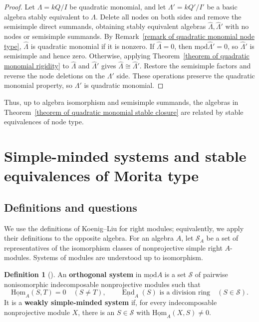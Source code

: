\documentclass[11pt]{article}
\newcommand{\End}{\operatorname{End}}
\newcommand{\smod}{\operatorname{\underline{mod}}}
\newcommand{\sHom}{\operatorname{\underline{Hom}}}
\providecommand{\varLambda}{\Lambda}
\theoremstyle{definition}
\newtheorem{definition}[theorem]{Definition}
\begin{document}
		\begin{proof}
			Let $\varLambda=kQ/I$ be quadratic monomial, and let $\varLambda'=kQ'/I'$ be a basic algebra stably equivalent to $\varLambda$.
			Delete all nodes on both sides and remove the semisimple direct summands, obtaining stably equivalent algebras $\widehat{\varLambda},\widehat{\varLambda}'$ with no nodes or semisimple summands.
			By Remark~\ref{remark of quadratic monomial node type}, $\widehat{\varLambda}$ is quadratic monomial if it is nonzero.
			If $\widehat{\varLambda}=0$, then $\smod\widehat{\varLambda}'=0$, so $\widehat{\varLambda}'$ is semisimple and hence zero.
			Otherwise, applying Theorem~\ref{theorem of quadratic monomial rigidity} to $\widehat{\varLambda}$ and $\widehat{\varLambda}'$ gives $\widehat{\varLambda}\cong\widehat{\varLambda}'$.
			Restore the semisimple factors and reverse the node deletions on the $\varLambda'$ side.
			These operations preserve the quadratic monomial property, so $\varLambda'$ is quadratic monomial.
		\end{proof}

		Thus, up to algebra isomorphism and semisimple summands, the algebras in Theorem~\ref{theorem of quadratic monomial stable closure} are related by stable equivalences of node type.

\section{Simple-minded systems and stable equivalences of Morita type}\label{section of sms and Morita type}


	\subsection{Definitions and questions}

		We use the definitions of Koenig--Liu for right modules; equivalently, we apply their definitions to the opposite algebra.
		For an algebra $A$, let $\mathcal S_A$ be a set of representatives of the isomorphism classes of nonprojective simple right $A$-modules.
		Systems of modules are understood up to isomorphism.

		\begin{definition}[{\cite[Definitions~2.1 and~5.3]{KL12}}]\label{definition of weak sms}
			An \textbf{orthogonal system} in $\smod A$ is a set $\mathcal S$ of pairwise nonisomorphic indecomposable nonprojective modules such that
			\[
				\sHom_A(S,T)=0\quad(S\ne T),\qquad
				\underline{\End}_A(S)\text{ is a division ring}\quad(S\in\mathcal S).
			\]
			It is a \textbf{weakly simple-minded system} if, for every indecomposable nonprojective module $X$, there is an $S\in\mathcal S$ with $\sHom_A(X,S)\ne0$.
		\end{definition}
\end{document}

